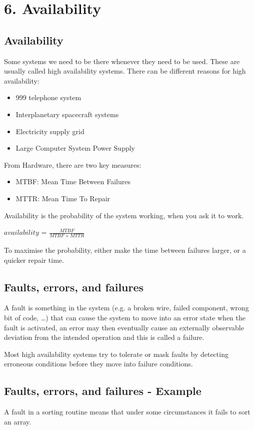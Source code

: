 \documentclass{report}
\begin{document}
\chapter{6. Availability}
\section{Availability}

Some systems we need to	be there whenever they need to be used.	These are usually called high availability systems.	
There can be different reasons for high availability:	
\begin{itemize}
\item{999 telephone system}
\item{Interplanetary spacecraft systems}
\item{Electricity supply grid}
\item{Large Computer System Power Supply}
\end{itemize}

From Hardware, there are two key measures:
\begin{itemize}
\item{MTBF: Mean Time Between Failures}
\item{MTTR: Mean Time To Repair}
\end{itemize}
Availability is the probability of the system working, when you ask it to work.\newline

$\textit{availability = }\frac{MTBF}{MTBF+MTTR}$\newline

To maximise the probability, either make the time between failures larger, or a quicker repair time.
\newline
\section{Faults, errors, and failures}
A fault is something in the system (e.g. a broken wire, failed component, wrong bit of code, …)	that can cause the system to move into an error	state when the fault is activated, an error may then eventually cause an externally observable deviation from the intended operation and this is called a failure.\newline

Most high availability systems try to tolerate or mask faults by detecting erroneous conditions before they move into failure	conditions. 

\section{Faults, errors, and failures - Example}
A fault in a sorting routine means that under some circumstances it fails to sort an array.\newline
\end{document}
